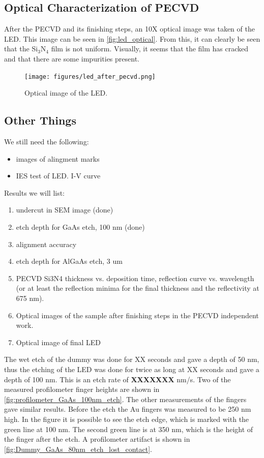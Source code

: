 \subsection{Optical Characterization of PECVD}

After the PECVD and its finishing steps, an 10X optical image was taken of the LED.
This image can be seen in \autoref{fig:led_optical}.
From this, it can clearly be seen that the Si$_3$N$_4$ film is not uniform.
Visually, it seems that the film has cracked and that there are some impurities present.

\begin{figure}
    \centering
    \texttt{[image: figures/led\_after\_pecvd.png]}
    \caption{Optical image of the LED.}
    \label{fig:led_optical}
\end{figure}



\subsection{Other Things}
We still need the following:
\begin{itemize}
    \color{red}
    \item images of alingment marks
    \item IES test of LED. I-V curve
\end{itemize}


Results we will list:

\begin{enumerate}
    \color{olive}
    \item undercut in SEM image (done)
    \item etch depth for GaAs etch, 100 nm (done)
    \color{violet}
    \item alignment accuracy
    \item etch depth for AlGaAs etch, 3 um
    \item PECVD Si3N4 thickness vs. deposition time, reflection curve vs. wavelength (or at least the reflection minima for the final thickness and the reflectivity at 675 nm).
    \item Optical images of the sample after finishing steps in the PECVD independent work.
    \item Optical image of final LED
\end{enumerate}




The wet etch of the dummy was done for XX seconds and gave a depth of 50 nm, thus the etching of the LED was done for twice as long at XX seconds and gave a depth of 100 nm.
This is an etch rate of \textbf{XXXXXXX} nm/s.
Two of the measured profilometer finger heights are shown in \autoref{fig:profilometer_GaAs_100nm_etch}.
The other measurements of the fingers gave similar results.
Before the etch the Au fingers was measured to be 250 nm high.
In the figure it is possible to see the etch edge, which is marked with the green line at 100 nm. 
The second green line is at 350 nm, which is the height of the finger after the etch.
A profilometer artifact is shown in \autoref{fig:Dummy_GaAs_80nm_etch_lost_contact}.



